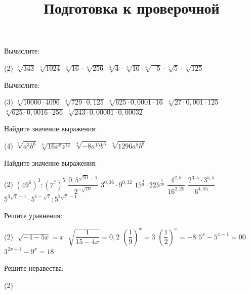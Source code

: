 \begin{class}[number=7]
	\title{Подготовка к проверочной}
	\begin{listofex}
		\item Вычислите:
		\begin{tasks}(2)
			\task \( \sqrt[3]{343} \)
			\task \( \sqrt[5]{1024} \)
			\task \( \sqrt[4]{16} \cdot \sqrt[4]{256} \)
			\task \( \sqrt[3]{4} \cdot \sqrt[3]{16} \)
			\task \( \sqrt[5]{-5} \cdot \sqrt[5]{5} \cdot \sqrt[5]{125} \)
		\end{tasks}
		\item Вычислите:
		\begin{tasks}(3)
			\task \( \sqrt[4]{10000 \cdot 4096} \)
			\task \( \sqrt[3]{729 \cdot 0,125} \)
			\task \( \sqrt[4]{625 \cdot 0,0001 \cdot 16} \)
			\task \( \sqrt[3]{27 \cdot 0,001 \cdot 125} \)
			\task \( \sqrt[4]{625 \cdot 0,0016 \cdot 256} \)
			\task \( \sqrt[5]{243 \cdot 0,00001 \cdot 0,00032} \)
		\end{tasks}
		\item Найдите значение выражения:
		\begin{tasks}(4)
			\task \( \sqrt[3]{a^3b^6} \)
			\task \( \sqrt[4]{16x^8z^{12}} \)
			\task \( \sqrt[3]{-8a^{15}b^3} \)
			\task \( \sqrt[4]{1296a^8b^8} \)
		\end{tasks}
		\item Найдите значение выражения:
		\begin{tasks}(2)
			\task \( (49^6)^3:(7^7)^5 \)
			\task \( \dfrac{0,5^{\sqrt{10}-1}}{2^{-\sqrt{10}}} \)
			\task \( 3^{0,36} \cdot 9^{0,32} \)
			\task \( 15^{\tfrac{4}{9}} \cdot 225^{\tfrac{5}{18}} \)
			\task \( \dfrac{4^{2,5}}{16^{2,25}} \)
			\task \( \dfrac{2^{3,5}\cdot3^{5,5}}{6^{4,55}} \)
			\task \( 5^{3\sqrt{7}-1}\cdot 5^{1-\sqrt{7}}:5^{2\sqrt{7}-1} \)
		\end{tasks}
		\item Решите уравнения:
		\begin{tasks}(2)
			\task \( \sqrt[]{-4-5x}=x \)
			\task \( \sqrt[]{\dfrac{1}{15-4x}}=0,2 \)
			\task \( \left( \dfrac{1}{9} \right)^x=3  \)
			\task \( \left( \dfrac{1}{2} \right)^x=-8 \)
			\task \( 5^{x}-5^{x-1}=00 \)
			\task \( 3^{2x+1}-9^x=18 \)
		\end{tasks}
		\item Решите неравества:
		\begin{tasks}(2)

\end{tasks}
\end{listofex}
\end{class}
